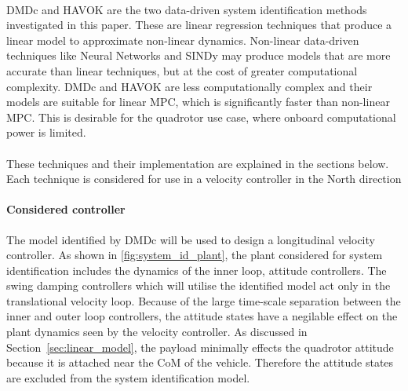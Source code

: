         \paragraph{}
        DMDc and HAVOK are the two data-driven system identification methods investigated in this paper. 
        These are linear regression techniques that produce a linear model to approximate non-linear dynamics.
        Non-linear data-driven techniques like Neural Networks and SINDy \cite{Brunton2016} may produce models that are more accurate than linear techniques, 
        but at the cost of greater computational complexity.
        DMDc and HAVOK are less computationally complex and their models are suitable for linear MPC, which is significantly faster than non-linear MPC.
        This is desirable for the quadrotor use case, where onboard computational power is limited.
        
        \paragraph{}
        These techniques and their implementation are explained in the sections below.
        Each technique is considered for use in a velocity controller in the North direction

        \paragraph{Considered controller}
        The model identified by DMDc will be used to design a longitudinal velocity controller.
        As shown in \ref{fig:system_id_plant}, the plant considered for system identification includes the dynamics of the inner loop, attitude controllers.
        The swing damping controllers which will utilise the identified model act only in the translational velocity loop.
        Because of the large time-scale separation between the inner and outer loop controllers, 
        the attitude states have a negilable effect on the plant dynamics seen by the velocity controller.
        As discussed in Section~\ref{sec:linear_model}, the payload minimally effects the quadrotor attitude because it is attached near the CoM of the vehicle.
        Therefore the attitude states are excluded from the system identification model.

